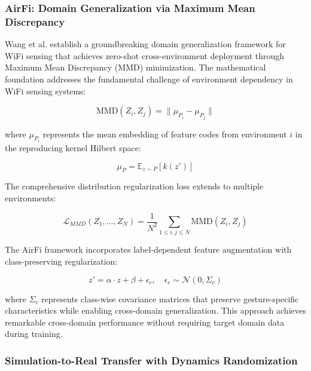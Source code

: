 \documentclass[journal]{IEEEtran}
\begin{document}
\subsubsection{AirFi: Domain Generalization via Maximum Mean Discrepancy}

Wang et al. \cite{wang2022airfi} establish a groundbreaking domain generalization framework for WiFi sensing that achieves zero-shot cross-environment deployment through Maximum Mean Discrepancy (MMD) minimization. The mathematical foundation addresses the fundamental challenge of environment dependency in WiFi sensing systems:

\begin{equation}
\text{MMD}(Z_i, Z_j) = \|\mu_{P_i} - \mu_{P_j}\|
\label{eq:airfi_mmd_basic}
\end{equation}

where $\mu_{P_i}$ represents the mean embedding of feature codes from environment $i$ in the reproducing kernel Hilbert space:

\begin{equation}
\mu_P = \mathbb{E}_{z \sim P}[k(z')]
\label{eq:airfi_kernel_mapping}
\end{equation}

The comprehensive distribution regularization loss extends to multiple environments:

\begin{equation}
\mathcal{L}_{MMD}(Z_1, \ldots, Z_N) = \frac{1}{N^2} \sum_{1 \leq i,j \leq N} \text{MMD}(Z_i, Z_j)
\label{eq:airfi_mmd_loss}
\end{equation}

The AirFi framework incorporates label-dependent feature augmentation with class-preserving regularization:

\begin{equation}
z' = \alpha \cdot z + \beta + \epsilon_c, \quad \epsilon_c \sim \mathcal{N}(0, \Sigma_c)
\label{eq:airfi_feature_augmentation}
\end{equation}

where $\Sigma_c$ represents class-wise covariance matrices that preserve gesture-specific characteristics while enabling cross-domain generalization. This approach achieves remarkable cross-domain performance without requiring target domain data during training.

\subsubsection{Simulation-to-Real Transfer with Dynamics Randomization}
\end{document}
